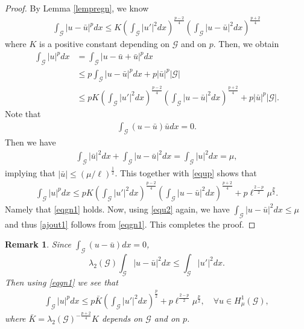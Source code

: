 \documentclass[10pt,a4paper]{article}
\newtheorem{remark}[theorem]{Remark}
\theoremstyle{definition} \theoremstyle{remark}
\numberwithin{equation}{section}
\newcommand{\G}{\mathcal{G}}
\begin{document}
\begin{proof}
	By Lemma \ref{lempregn}, we know
	\begin{align*}
		\int_\G|u-\bar{u}|^pdx \leq K\left( \int_\G|u'|^2dx\right)^{\frac{p-2}4}\left( \int_\G|u-\bar{u}|^2dx\right)^{\frac{p+2}4}
	\end{align*}
where $K$ is a positive constant depending on $\G$ and on $p$. Then, we obtain
\begin{align} \label{equp}
	\int_\G|u|^pdx & = \int_\G|u-\bar{u} + \bar{u}|^pdx \nonumber \\
	& \leq p\int_\G|u-\bar{u}|^pdx + p|\bar{u}|^p|\G| \nonumber \\
	& \leq pK\left( \int_\G|u'|^2dx\right)^{\frac{p-2}4}\left( \int_\G|u-\bar{u}|^2dx\right)^{\frac{p+2}4} + p|\bar{u}|^p|\G|. 
\end{align}
Note that
\begin{align*}
	\int_\G(u-\bar{u})\bar{u}dx = 0.
\end{align*}
Then we have
\begin{align} \label{equ2}
	\int_\G|\bar{u}|^2dx + \int_\G|u-\bar{u}|^2dx = \int_\G|u|^2dx = \mu,
\end{align}
implying that $|\bar{u}| \leq (\mu/\ell)^{\frac12}$. This together with \eqref{equp} shows that
\begin{align*}
	\int_\G|u|^pdx \leq pK\left( \int_\G|u'|^2dx\right)^{\frac{p-2}4}\left( \int_\G|u-\bar{u}|^2dx\right)^{\frac{p+2}4} + p\ell^{\frac{2-p}2}\mu^\frac p2.
\end{align*}
Namely that \eqref{eqgn1} holds. Now, using \eqref{equ2} again, we have $\int_\G|u-\bar{u}|^2dx \leq \mu$ and thus \eqref{ajout1} follows from \eqref{eqgn1}. This completes the proof.

\end{proof}


\begin{remark}
	Since $\int_\G(u-\bar{u})dx = 0$, 
	$$
	\lambda_2(\G)\int_\G|u-\bar{u}|^2dx \leq \int_\G|u'|^2dx.
	$$
	Then using \eqref{eqgn1} we see that
	\begin{align*}
		\int_\G|u|^pdx \leq p\bar{K}\left( \int_\G|u'|^2dx\right)^{\frac p2} + p\ell^{\frac{2-p}2}\mu^\frac p2, \quad \forall u \in H_\mu^1(\G),
	\end{align*}
where $\bar{K} = \lambda_2(\G)^{-\frac{p+2}4}K$ depends on $\G$ and on $p$.
\end{remark}
\end{document}
